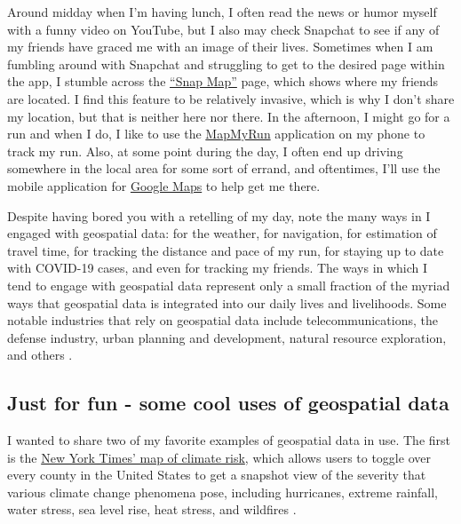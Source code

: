 \documentclass[12pt]{article}
\begin{document}
Around midday when I'm having lunch, I often read the news or humor
myself with a funny video on YouTube, but I also may check Snapchat to
see if any of my friends have graced me with an image of their lives.
Sometimes when I am fumbling around with Snapchat and struggling to get
to the desired page within the app, I stumble across the
\href{https://map.snapchat.com/}{``Snap Map''} page, which shows where
my friends are located. I find this feature to be relatively invasive,
which is why I don't share my location, but that is neither here nor
there. In the afternoon, I might go for a run and when I do, I like to
use the \href{https://www.mapmyrun.com/us/}{MapMyRun} application on my
phone to track my run. Also, at some point during the day, I often end
up driving somewhere in the local area for some sort of errand, and
oftentimes, I'll use the mobile application for
\href{https://www.google.com/maps}{Google Maps} to help get me there.

Despite having bored you with a retelling of my day, note the many ways
in I engaged with geospatial data: for the weather, for navigation, for
estimation of travel time, for tracking the distance and pace of my run,
for staying up to date with COVID-19 cases, and even for tracking my
friends. The ways in which I tend to engage with geospatial data
represent only a small fraction of the myriad ways that geospatial data
is integrated into our daily lives and livelihoods. Some notable
industries that rely on geospatial data include telecommunications, the
defense industry, urban planning and development, natural resource
exploration, and others \citep{omnisciGeospatialCompleteIntroduction}.

\hypertarget{just-for-fun---some-cool-uses-of-geospatial-data}{%
\subsection{Just for fun - some cool uses of geospatial
data}\label{just-for-fun---some-cool-uses-of-geospatial-data}}

I wanted to share two of my favorite examples of geospatial data in use.
The first is the
\href{https://www.nytimes.com/interactive/2020/09/18/opinion/wildfire-hurricane-climate.html}{New
York Times' map of climate risk}, which allows users to toggle over
every county in the United States to get a snapshot view of the severity
that various climate change phenomena pose, including hurricanes,
extreme rainfall, water stress, sea level rise, heat stress, and
wildfires \citep{thompsonEveryPlaceHas2020}.
\end{document}
